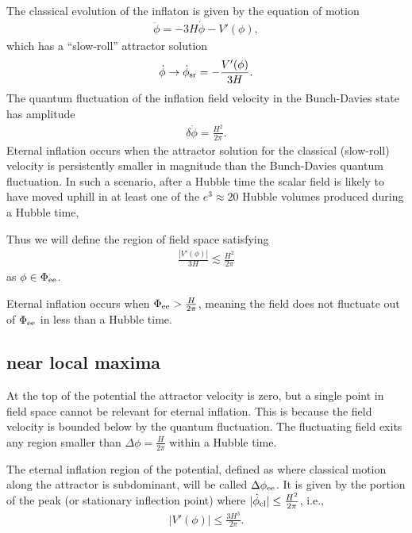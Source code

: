 \documentclass[aps,amsfonts,amsmath,prd,preprint,nofootinbib]{revtex4}
\newcommand{\MMp}{{M_P^2}}
\begin{document}
\begin{appendix}
The classical evolution of the inflaton is given by the equation of motion
\begin{align}
\ddot \phi = -3 H \dot \phi - V'(\phi),
\end{align}
which has a ``slow-roll'' attractor solution
\begin{align}
\dot \phi \to \dot \phi_{\rm sr} = -\frac{V'(\phi)}{3 H}.
\end{align}
 The quantum fluctuation of the inflation field velocity in the Bunch-Davies state has amplitude
\begin{align}
\delta \dot \phi = \frac{H^2}{2\pi}.
\end{align} 
Eternal inflation occurs when the attractor solution for the classical (slow-roll) velocity
is persistently smaller in magnitude than the Bunch-Davies quantum fluctuation.  In such a scenario, after a Hubble
time the scalar field is likely to have moved uphill in at least one of the $e^3\approx 20$ Hubble volumes produced during
a Hubble time, 

Thus we will define the region of field space satisfying
\begin{align}
\frac{\left| V'(\phi)\right|}{3 H} \lesssim  \frac{H^2}{2\pi}
\end{align}
as $\phi \in \Phi_{\rm ee}$.

Eternal inflation occurs when $\Phi_{\rm ee} > \frac{H}{2\pi}$, meaning the field does not fluctuate out of $\Phi_{\rm ee}$ in less than a Hubble time.


\subsection{near local maxima}\label{app:sei}
At the top of the potential the attractor velocity is zero, but a single point in field space cannot be relevant for eternal inflation\cite{Barenboim:2016mmw}.  
This is because the field velocity is bounded below by the quantum fluctuation.  
The fluctuating field exits any region smaller than $\Delta\phi = \frac{H}{2\pi}$ within a Hubble time.  



The eternal inflation region of the potential, defined as where classical motion along the attractor is subdominant, will be called $\Delta\phi_{\rm ee}$.  
It is given by the portion of the peak (or stationary inflection point) where $|\dot\phi_{\rm cl}| \leq \frac{H^2}{2\pi}$, i.e.,
\begin{align}
\left|V'(\phi)\right| \leq \frac{3 H^3}{2\pi}.
\end{align}


\end{appendix}
\end{document}

